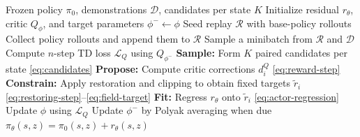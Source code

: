 \begin{algorithm}[t]
  \caption{CAST: online residual fine-tuning}
  \label{alg:cast}
  \small
  \begin{algorithmic}[1]
    \Require Frozen policy $\pi_0$, demonstrations $\mathcal D$,
      candidates per state $K$
    \State Initialize residual $r_\theta$, critic $Q_\phi$,
      and target parameters $\phi^-\gets\phi$
    \State Seed replay $\mathcal R$ with base-policy rollouts
      \State Collect policy rollouts and append them to $\mathcal R$
        \State Sample a minibatch from $\mathcal R$ and $\mathcal D$
        \State Compute $n$-step TD loss $\mathcal L_Q$ using $Q_{\phi^-}$
          \State \textbf{Sample:} Form $K$ paired candidates per state
            \eqref{eq:candidates}
          \State \textbf{Propose:} Compute critic corrections $d_i^Q$
            \eqref{eq:reward-step}
          \State \textbf{Constrain:} Apply restoration and clipping
            to obtain fixed targets $\tilde r_i$
            \eqref{eq:restoring-step}--\eqref{eq:field-target}
          \State \textbf{Fit:} Regress $r_\theta$ onto $\tilde r_i$
            \eqref{eq:actor-regression}
        \EndIf
        \State Update $\phi$ using $\mathcal L_Q$
        \State Update $\phi^-$ by Polyak averaging when due
      \EndFor
    \EndFor
    \State \Return $\pi_\theta(s,z)=\pi_0(s,z)+r_\theta(s,z)$
  \end{algorithmic}
\end{algorithm}
